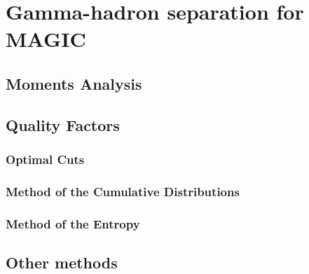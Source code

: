 

\chapter{Gamma-hadron separation for MAGIC}
\label{chapter:ghsep}

\section{Moments Analysis}

\section{Quality Factors}

\subsection{Optimal Cuts}

\subsection{Method of the Cumulative Distributions}

\subsection{Method of the Entropy}

\section{Other methods}

\endinput
%


